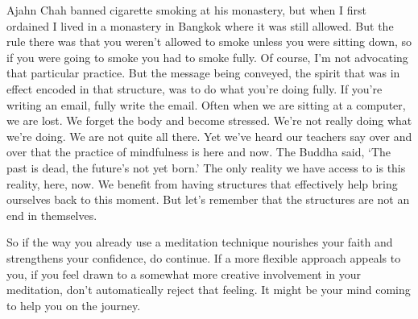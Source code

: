 Ajahn Chah banned cigarette smoking at his monastery, but when I first
ordained I lived in a monastery in Bangkok where it was still allowed.
But the rule there was that you weren’t allowed to smoke unless you were
sitting down, so if you were going to smoke you had to smoke fully. Of
course, I’m not advocating that particular practice. But the message
being conveyed, the spirit that was in effect encoded in that structure,
was to do what you’re doing fully. If you’re writing an email, fully
write the email. Often when we are sitting at a computer, we are lost.
We forget the body and become stressed. We’re not really doing what
we’re doing. We are not quite all there. Yet we’ve heard our teachers
say over and over that the practice of mindfulness is here and now. The
Buddha said, ‘The past is dead, the future’s not yet born.’ The only
reality we have access to is this reality, here, now. We benefit from
having structures that effectively help bring ourselves back to this
moment. But let’s remember that the structures are not an end in
themselves.

\enlargethispage*{\baselineskip}

So if the way you already use a meditation technique nourishes your
faith and strengthens your confidence, do continue. If a more flexible
approach appeals to you, if you feel drawn to a somewhat more creative
involvement in your meditation, don’t automatically reject that feeling.
It might be your mind coming to help you on the journey.
